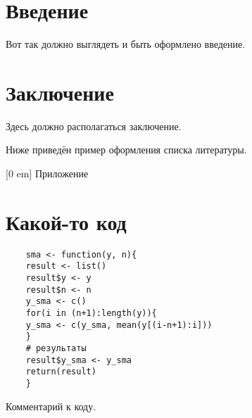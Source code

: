 \documentclass[12pt, a4paper, oneside]{extreport}
\begin{document}
	
	\tableofcontents  %
	
	\chapter*{Введение}
	
	Вот так должно выглядеть и быть оформлено введение.
	
	
	
	\chapter*{Заключение}
	
	Здесь должно располагаться заключение.
	
	Ниже приведён пример оформления списка литературы.
	
	\newpage
	\nocite{*}  %
	
	\begingroup
	\printbibliography[title = Список литературы]
	\endgroup
	
	
	
	\appendix
	
		
	[0 em] %
	{\normalsize}
	{}
	{Приложение }
	{\contentspage}
	
	
	\chapter[Какой-то код]{Какой-то код}\label{app-a}
	
	\begin{verbatim}
	sma <- function(y, n){
	result <- list()
	result$y <- y
	result$n <- n
	y_sma <- c()
	for(i in (n+1):length(y)){
	y_sma <- c(y_sma, mean(y[(i-n+1):i]))
	}
	# результаты
	result$y_sma <- y_sma
	return(result)
	}
	\end{verbatim}
	
	Комментарий к коду.
	
\end{document}
